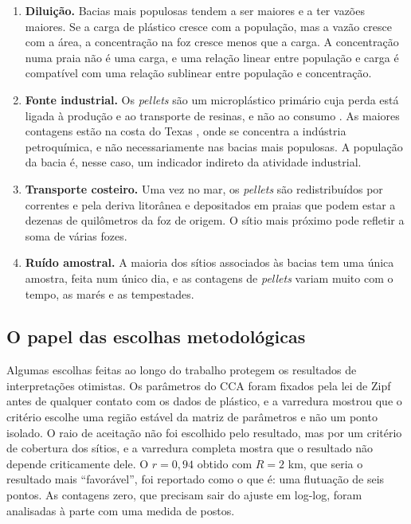 \begin{enumerate}
	\item \textbf{Diluição.} Bacias mais populosas tendem a ser maiores e a ter vazões maiores. Se a carga de plástico cresce com a população, mas a vazão cresce com a área, a concentração na foz cresce menos que a carga. A concentração numa praia não é uma carga, e uma relação linear entre população e carga é compatível com uma relação sublinear entre população e concentração.
	\item \textbf{Fonte industrial.} Os \textit{pellets} são um microplástico primário cuja perda está ligada à produção e ao transporte de resinas, e não ao consumo \cite{karlsson2018}. As maiores contagens estão na costa do Texas \cite{tunnell2020}, onde se concentra a indústria petroquímica, e não necessariamente nas bacias mais populosas. A população da bacia é, nesse caso, um indicador indireto da atividade industrial.
	\item \textbf{Transporte costeiro.} Uma vez no mar, os \textit{pellets} são redistribuídos por correntes e pela deriva litorânea e depositados em praias que podem estar a dezenas de quilômetros da foz de origem. O sítio mais próximo pode refletir a soma de várias fozes.
	\item \textbf{Ruído amostral.} A maioria dos sítios associados às bacias tem uma única amostra, feita num único dia, e as contagens de \textit{pellets} variam muito com o tempo, as marés e as tempestades.
\end{enumerate}

\subsection{O papel das escolhas metodológicas}

Algumas escolhas feitas ao longo do trabalho protegem os resultados de interpretações otimistas. Os parâmetros do CCA foram fixados pela lei de Zipf antes de qualquer contato com os dados de plástico, e a varredura mostrou que o critério escolhe uma região estável da matriz de parâmetros e não um ponto isolado. O raio de aceitação não foi escolhido pelo resultado, mas por um critério de cobertura dos sítios, e a varredura completa mostra que o resultado não depende criticamente dele. O $r = 0{,}94$ obtido com $R = 2$ km, que seria o resultado mais ``favorável'', foi reportado como o que é: uma flutuação de seis pontos. As contagens zero, que precisam sair do ajuste em log-log, foram analisadas à parte com uma medida de postos.

